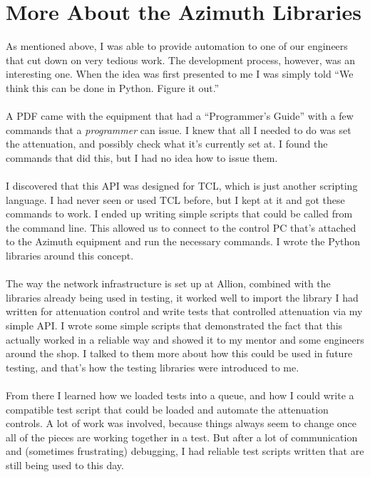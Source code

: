 \documentclass{article}
\begin{document}
\section*{More About the Azimuth Libraries}
As mentioned above, I was able to provide automation to one of our engineers
that cut down on very tedious work. The development process, however, was an
interesting one. When the idea was first presented to me I was simply told ``We
think this can be done in Python. Figure it out.''\\
\\
A PDF came with the equipment that had a ``Programmer's Guide'' with a few
commands that a \emph{programmer} can issue. I knew that all I needed to do was
set the attenuation, and possibly check what it's currently set at. I found the
commands that did this, but I had no idea how to issue them.\\
\\
I discovered that this API was designed for TCL, which is just another scripting
language. I had never seen or used TCL before, but I kept at it and got these
commands to work. I ended up writing simple scripts that could be called from
the command line. This allowed us to connect to the control PC that's attached
to the Azimuth equipment and run the necessary commands. I wrote the Python
libraries around this concept.\\
\\
The way the network infrastructure is set up at Allion, combined with the 
libraries already being used in testing, it worked well to import the library
I had written for attenuation control and write tests that controlled
attenuation via my simple API. I wrote some simple scripts that demonstrated
the fact that this actually worked in a reliable way and showed it to my mentor
and some engineers around the shop. I talked to them more about how this could
be used in future testing, and that's how the testing libraries were introduced
to me.\\
\\
From there I learned how we loaded tests into a queue, and how I could write a
compatible test script that could be loaded and automate the attenuation
controls. A lot of work was involved, because things always seem to change once
all of the pieces are working together in a test. But after a lot of
communication and (sometimes frustrating) debugging, I had reliable test scripts
written that are still being used to this day.
\end{document}

